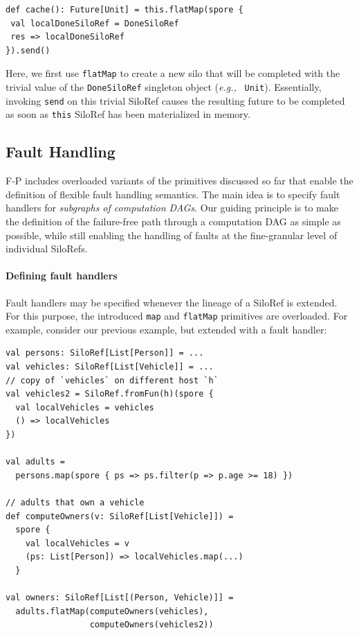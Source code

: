 \documentclass[preprint]{sigplanconf}
\theoremstyle{definition}
\theoremstyle{definition}
\newcommand{\eg}{{\em e.g.,~}}
\begin{document}
\begin{lstlisting}
def cache(): Future[Unit] = this.flatMap(spore {
 val localDoneSiloRef = DoneSiloRef
 res => localDoneSiloRef
}).send()

\end{lstlisting}
\noindent
Here, we first use \verb|flatMap| to create a new silo that will be completed
with the trivial value of the \verb|DoneSiloRef| singleton object (\eg
\verb|Unit|). Essentially, invoking \verb|send| on this trivial SiloRef causes
the resulting future to be completed as soon as \verb|this| SiloRef has been
materialized in memory.






\subsection{Fault Handling}
\label{sec:fault-handling}

F-P includes overloaded variants of the primitives discussed so far that
enable the definition of flexible fault handling semantics. The main idea is
to specify fault handlers for \emph{subgraphs of computation DAGs}. Our
guiding principle is to make the definition of the failure-free path through a
computation DAG as simple as possible, while still enabling the handling of
faults at the fine-granular level of individual SiloRefs.

\paragraph{Defining fault handlers} Fault handlers may be specified whenever
the lineage of a SiloRef is extended. For this purpose, the introduced
\verb|map| and \verb|flatMap| primitives are overloaded. For example,
consider our previous example, but extended with a fault handler:

\begin{lstlisting}
val persons: SiloRef[List[Person]] = ...
val vehicles: SiloRef[List[Vehicle]] = ...
// copy of `vehicles` on different host `h`
val vehicles2 = SiloRef.fromFun(h)(spore {
  val localVehicles = vehicles
  () => localVehicles
})

val adults =
  persons.map(spore { ps => ps.filter(p => p.age >= 18) })

// adults that own a vehicle
def computeOwners(v: SiloRef[List[Vehicle]]) =
  spore {
    val localVehicles = v
    (ps: List[Person]) => localVehicles.map(...)
  }

val owners: SiloRef[List[(Person, Vehicle)]] =
  adults.flatMap(computeOwners(vehicles),
                 computeOwners(vehicles2))
\end{lstlisting}
\end{document}
